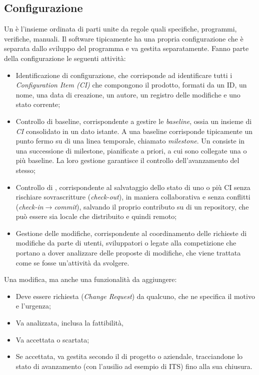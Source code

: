 \documentclass[../main]{subfiles}
\begin{document}
\subsection{Configurazione}
Un  è l'insieme ordinata di parti unite da regole quali specifiche, programmi, verifiche, manuali. Il software tipicamente ha una propria configurazione che è separata dallo sviluppo del programma e va gestita separatamente.
Fanno parte della configurazione le seguenti attività:
\begin{itemize}
    \item Identificazione di configurazione, che corrisponde ad identificare tutti i \textit{Configuration Item (CI)} che compongono il prodotto, formati da un ID, un nome, una data di creazione, un autore, un registro delle modifiche e uno stato corrente;
    \item Controllo di baseline, corrispondente a gestire le \textit{baseline}, ossia un insieme di \textit{CI} consolidato in un dato istante. A una baseline corrisponde tipicamente un punto fermo su di una linea temporale, chiamato \textit{milestone}. Un  consiste in una successione di milestone, pianificate a priori, a cui sono collegate una o più baseline. La loro gestione garantisce il controllo dell'avanzamento del  stesso;
    \item Controllo di , corrispondente al salvataggio dello stato di uno o più CI senza rischiare sovrascritture (\textit{check-out}), in maniera collaborativa e senza conflitti (\textit{check-in$\rightarrow$commit}), salvando il proprio contributo su di un repository, che può essere sia locale che distribuito e quindi remoto;
    \item Gestione delle modifiche, corrispondente al coordinamento delle richieste di modifiche da parte di utenti, sviluppatori o legate alla competizione che portano a dover analizzare delle proposte di modifiche, che viene trattata come se fosse un'attività da svolgere.
\end{itemize}
Una modifica, ma anche una funzionalità da aggiungere:
\begin{itemize}
    \item Deve essere richiesta (\textit{Change Request}) da qualcuno, che ne specifica il motivo e l'urgenza;
    \item Va analizzata, inclusa la fattibilità,
    \item Va accettata o scartata;
    \item Se accettata, va gestita secondo il  di progetto o aziendale, tracciandone lo stato di avanzamento (con l'ausilio ad esempio di ITS) fino alla sua chiusura.
\end{itemize}
\end{document}
